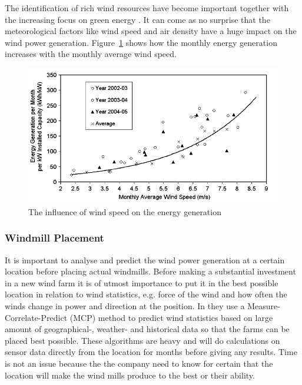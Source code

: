 The identification of rich wind resources have become important together with the increasing focus on green energy \cite{WindPowerGenerationUsingANN}. It can come as no surprise that the meteorological factors like wind speed and air density have a huge impact on the wind power generation. Figure~\ref{fig:energyGeneration} shows how the monthly energy generation increases with the monthly average wind speed. 

\begin{figure}[h!]
\centering
\includegraphics[width=0.8\linewidth,natwidth=898,natheight=587]{billeder/EnergyGenerationVsWindSpeed.png}
\caption{The influence of wind speed on the energy generation \cite{WindPowerGenerationUsingANN}}
\label{fig:energyGeneration}
\end{figure} 

\subsubsection{Windmill Placement}
\label{sec:windmillPlacement}
It is important to analyse and predict the wind power generation at a certain location before placing actual windmills. Before making a substantial investment in a new wind farm it is of utmost importance to put it in the best possible location in relation to wind statistics, e.g. force of the wind and how often the winds change in power and direction at the position. In \cite{4} they use a Measure-Correlate-Predict (MCP) method to predict wind statistics based on large amount of geographical-, weather- and historical data so that the farms can be placed best possible. These algorithms are heavy and will do calculations on sensor data directly from the location for months before giving any results. Time is not an issue because the the company need to know for certain that the location will make the wind mills produce to the best or their ability.

